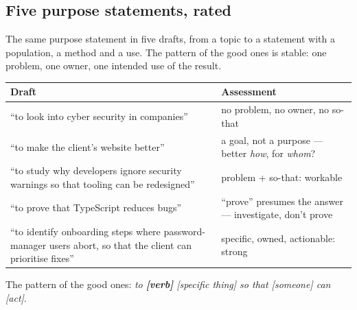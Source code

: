 \documentclass[11pt,a4paper,british,twoside=false,headings=small,chapterprefix=false,numbers=noenddot]{scrbook}
\begin{document}
\subsection{Five purpose statements, rated}
The same purpose statement in five drafts, from a topic to a statement with a population, a method and a use. The pattern of the good ones is stable: one problem, one owner, one intended use of the result.
\begin{center}\small
\footnotesize
  \renewcommand{\arraystretch}{1.3}
  \begin{tabular}{@{}p{9.2cm}p{4.0cm}@{}}
    \toprule
    \textbf{Draft} & \textbf{Assessment}\\
    \midrule
    ``to look into cyber security in companies'' & no problem, no owner, no so-that\\
    ``to make the client's website better'' & a goal, not a purpose --- better \emph{how}, for \emph{whom}?\\
    ``to study why developers ignore security warnings so that tooling can be redesigned'' & problem + so-that: workable\\
    ``to prove that TypeScript reduces bugs'' & ``prove'' presumes the answer --- investigate, don't prove\\
    ``to identify onboarding steps where password-manager users abort, so that the client can prioritise fixes'' & specific, owned, actionable: strong\\
    \bottomrule
  \end{tabular}
  

  The pattern of the good ones: \emph{to \textbf{[verb]} [specific thing] so
  that [someone] can [act]}.
\end{center}
\end{document}
